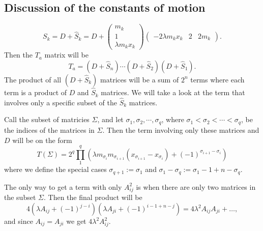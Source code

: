 \documentclass[english,master]{liumaiex}
\theoremstyle{plain}
\theoremstyle{definition}
\begin{document}
\subsection*{Discussion of the constants of motion}

\begin{equation}
	S_k = D + \hat{S}_k = D + 
	\begin{pmatrix}
		m_k \\ 1 \\ \lambda m_k x_k		
	\end{pmatrix}
	\begin{pmatrix}
		-2 \lambda m_k x_k & 2 & 2 m_k
	\end{pmatrix}.
\end{equation}
Then the $T_a$ matrix will be
\begin{equation}
	T_a = (D + \hat{S}_n)\cdots(D + \hat{S}_2)(D + \hat{S}_1).
\end{equation}
The product of all $(D + \hat{S}_k)$ matrices will be a sum of $2^n$ terms where each term is a product of $D$ and $\hat{S}_k$ matrices. We will take a look at the term that involves only a specific subset of the $\hat{S}_k$ matrices.

Call the subset of matricies $\Sigma$, and let $\sigma_1, \sigma_2, \cdots, \sigma_q$, where $\sigma_1 < \sigma_2 < \cdots < \sigma_q$, be the indices of the matrices in $\Sigma$. Then the term involving only these matrices and $D$ will be on the form
\begin{equation}
	T(\Sigma) = 2^q \prod_1^q (\lambda m_{\sigma_i} m_{\sigma_{i+1}} (x_{\sigma_{i+1}} - x_{\sigma_i}) + (-1)^{\sigma_{i+1} - \sigma_i})
\end{equation}
where we define the special cases $\sigma_{q+1} := \sigma_1$ and $\sigma_1 - \sigma_q := \sigma_1 - 1 + n - \sigma_q$.

The only way to get a term with only $A_{ij}^2$ is when there are only two matrices in the subset $\Sigma$. Then the final product will be
\begin{equation}
	4 (\lambda A_{ij} + (-1)^{j-i})(\lambda A_{ji} + (-1)^{i - 1 + n - j}) =
	4\lambda^2 A_{ij} A_{ji} + \dots,
\end{equation}
and since $A_{ij} = A_{ji}$ we get $4\lambda^2 A_{ij}^2$.
\end{document}
